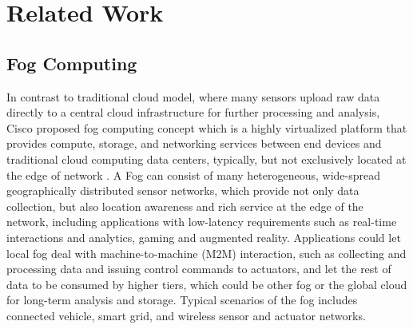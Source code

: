 \chapter{Related Work}\label{ch3}

\section{Fog Computing}

In contrast to traditional cloud model, where many sensors upload raw data directly to a central cloud infrastructure for further processing and analysis, Cisco proposed fog computing concept which is a highly virtualized platform that provides compute, storage, and networking services between end devices and traditional cloud computing data centers, typically, but not exclusively located at the edge of network \cite{Bonomi:2012:FCR:2342509.2342513}. A Fog can consist of many heterogeneous, wide-spread geographically distributed sensor networks, which provide not only data collection, but also location awareness and rich service at the edge of the network, including applications with low-latency requirements such as real-time interactions and analytics, gaming and augmented reality. 
Applications could let local fog deal with machine-to-machine (M2M) interaction, such as collecting and processing data and issuing control commands to actuators, and let the rest of data to be consumed by higher tiers, which could be other fog or the global cloud for long-term analysis and storage. Typical scenarios of the fog includes connected vehicle, smart grid, and wireless sensor and actuator networks. 